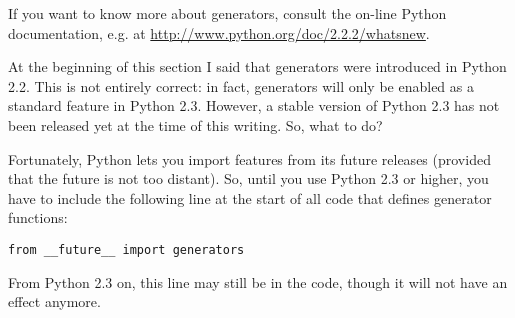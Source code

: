 If you want to know more about generators, consult the on-line Python
documentation, e.g. at \url{http://www.python.org/doc/2.2.2/whatsnew}. 

\begin{notice}[warning]
At the beginning of this section I said that generators were
introduced in Python 2.2. This is not entirely correct: in fact,
generators will only be enabled as a standard feature in Python 2.3.
However, a stable version of Python 2.3 has not been released yet at
the time of this writing. So, what to do?

Fortunately, Python lets you import features from its future releases
(provided that the future is not too distant). So, until you use
Python 2.3 or higher, you have to include the following line at the
start of all code that defines generator functions:

\begin{verbatim}
from __future__ import generators

\end{verbatim}

From Python 2.3 on, this line may still be in the code, though it
will not have an effect anymore.
\end{notice}

